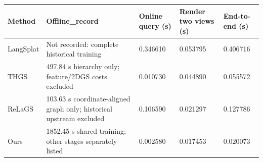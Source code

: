 \begin{tabular}{lllll}
\hline
Method & Offline\_record & Online query (s) & Render two views (s) & End-to-end (s) \\
\hline
LangSplat & Not recorded: complete historical training & 0.346610 & 0.053795 & 0.406716 \\
THGS & 497.84 s hierarchy only; feature/2DGS costs excluded & 0.010730 & 0.044890 & 0.055572 \\
ReLaGS & 103.63 s coordinate-aligned graph only; historical upstream excluded & 0.106590 & 0.021297 & 0.127786 \\
Ours & 1852.45 s shared training; other stages separately listed & 0.002580 & 0.017453 & 0.020073 \\
\hline
\end{tabular}
